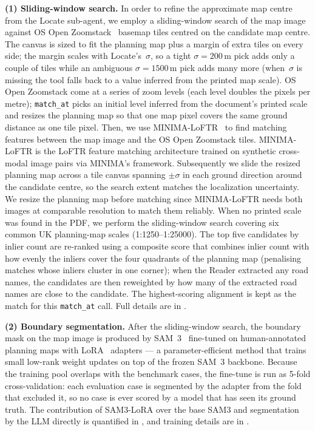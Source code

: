 \documentclass[11pt]{article}
\begin{document}
\textbf{(1) Sliding-window search.} In order to refine the approximate map centre from the Locate sub-agent, we employ a sliding-window search of the map image against OS Open Zoomstack~\cite{os_open_zoomstack} basemap tiles centred on the candidate map centre. The canvas is sized to fit the planning map plus a margin of extra tiles on every side; the margin scales with Locate's~$\sigma$, so a tight $\sigma{=}200$\,m pick adds only a couple of tiles while an ambiguous $\sigma{=}1500$\,m pick adds many more (when~$\sigma$ is missing the tool falls back to a value inferred from the printed map scale). OS Open Zoomstack come at a series of zoom levels (each level doubles the pixels per metre); \texttt{match\_at} picks an initial level inferred from the document's printed scale and resizes the planning map so that one map pixel covers the same ground distance as one tile pixel. Then, we use MINIMA-LoFTR~\cite{Sun_2021_CVPR,Ren_2025_CVPR} to find matching features between the map image and the OS Open Zoomstack tiles. MINIMA-LoFTR is the LoFTR feature matching architecture trained on synthetic cross-modal image pairs via MINIMA's framework. Subsequently we slide the resized planning map across a tile canvas spanning $\pm \sigma$ in each ground direction around the candidate centre, so the search extent matches the localization uncertainty.  We resize the planning map before matching since MINIMA-LoFTR needs both images at comparable resolution to match them reliably. When no printed scale was found in the PDF, we perform the sliding-window search covering six common UK planning-map scales (1:1250--1:25000). The top five candidates by inlier count are re-ranked using a composite score that combines inlier count with how evenly the inliers cover the four quadrants of the planning map (penalising matches whose inliers cluster in one corner); when the Reader extracted any road names, the candidates are then reweighted by how many of the extracted road names are close to the candidate. The highest-scoring alignment is kept as the match for this \texttt{match\_at} call. Full details are in .

\textbf{(2) Boundary segmentation.} After the sliding-window search, the boundary mask on the map image is produced by SAM~3~\cite{carion2025sam3segmentconcepts} fine-tuned on human-annotated planning maps with LoRA~\cite{hu2022lora} adapters --- a parameter-efficient method that trains small low-rank weight updates on top of the frozen SAM~3 backbone. Because the training pool overlaps with the benchmark cases, the fine-tune is run as 5-fold cross-validation: each evaluation case is segmented by the adapter from the fold that excluded it, so no case is ever scored by a model that has seen its ground truth. The contribution of SAM3-LoRA over the base SAM3 and segmentation by the LLM directly is quantified in , and training details are in .
\end{document}
